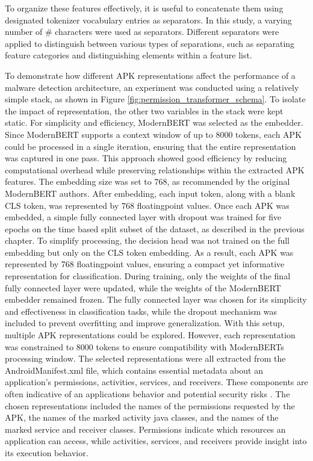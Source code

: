 To organize these features effectively, 
it is useful to concatenate them using designated tokenizer vocabulary entries as separators.
In this study, a varying number of \# characters were used as separators. 
Different separators were applied to distinguish between various types of separations, 
such as separating feature categories and distinguishing elements within a feature list.

To demonstrate how different APK representations affect the performance of a malware detection architecture, 
an experiment was conducted using a relatively simple stack, as shown in Figure \ref{fig:permission_transformer_schema}.
To isolate the impact of representation, the other two variables in the stack were kept static. 
For simplicity and efficiency, ModernBERT \cite{modernbert} was selected as the embedder. 
Since ModernBERT supports a context window of up to 8000 tokens, each APK could be processed in a single iteration, 
ensuring that the entire representation was captured in one pass. 
This approach showed good efficiency by reducing computational overhead while preserving relationships within 
the extracted APK features.
The embedding size was set to 768, as recommended by the original ModernBERT authors. 
After embedding, each input token, along with a blank CLS token, was represented by 768 floatingpoint values. 
Once each APK was embedded, a simple fully connected layer with dropout was trained for five epochs  
on the time based split subset of the dataset, as described in the previous chapter. 
To simplify processing, the decision head was not trained on the full embedding but only on the CLS token embedding. 
As a result, each APK was represented by 768 floatingpoint values, 
ensuring a compact yet informative representation for classification.
During training, only the weights of the final fully connected layer were updated, 
while the weights of the ModernBERT embedder remained frozen. 
The fully connected layer was chosen for its simplicity and effectiveness in classification tasks, 
while the dropout mechanism was included to prevent overfitting and improve generalization.
With this setup, multiple APK representations could be explored. 
However, each representation was constrained to 8000 tokens to ensure compatibility with 
ModernBERTs processing window. 
The selected representations were all extracted from the AndroidManifest.xml file, 
which contains essential metadata about an application's permissions, activities, services, and receivers. 
These components are often indicative of an applications behavior and potential security risks \cite{malbert}.
The chosen representations included the names of the permissions requested by the APK, 
the names of the marked activity java classes, and the names of the marked service and receiver classes. 
Permissions indicate which resources an application can access, 
while activities, services, and receivers provide insight into its execution behavior.

